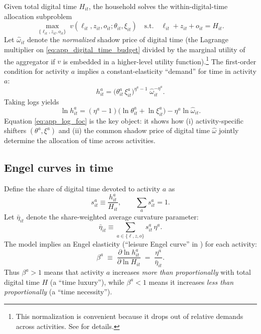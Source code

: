 \documentclass[12pt]{article}
\begin{document}
Given total digital time $H_{it}$, the household solves the within-digital-time allocation subproblem
\begin{equation}
\label{eq:app_subproblem}
\max_{\{\ell_{it},z_{it},o_{it}\}} \; v(\ell_{it},z_{it},o_{it};\theta_{it},\xi_{it})
\quad \text{s.t.}\quad
\ell_{it}+z_{it}+o_{it}=H_{it}.
\end{equation}
Let $\hat{\omega}_{it}$ denote the \emph{normalized} shadow price of digital time (the Lagrange multiplier on \eqref{eq:app_digital_time_budget} divided by the marginal utility of the aggregator if $v$ is embedded in a higher-level utility function).\footnote{This normalization is convenient because it drops out of relative demands across activities. See \citet{aguiar2021} for details.} The first-order condition for activity $a$ implies a constant-elasticity ``demand'' for time in activity $a$:
\begin{equation}
\label{eq:app_activity_demand}
h_{it}^{a}
=
\big(\theta_{it}^{a}\,\xi_{it}^{a}\big)^{\eta^{a}-1}\;
\hat{\omega}_{it}^{-\eta^{a}}.
\end{equation}
Taking logs yields
\begin{equation}
\label{eq:app_log_foc}
\ln h_{it}^{a}
=
(\eta^{a}-1)\big(\ln\theta_{it}^{a}+\ln\xi_{it}^{a}\big)
-\eta^{a}\ln\hat{\omega}_{it}.
\end{equation}
Equation \eqref{eq:app_log_foc} is the key object: it shows how (i) activity-specific shifters $(\theta^{a},\xi^{a})$ and (ii) the common shadow price of digital time $\hat{\omega}$ jointly determine the allocation of time across activities.

\subsection{Engel curves in time}
\label{app:engel_curves}

Define the share of digital time devoted to activity $a$ as
\begin{equation}
s_{it}^{a} \equiv \frac{h_{it}^{a}}{H_{it}},\qquad \sum_{a}s_{it}^{a}=1.
\end{equation}
Let $\bar{\eta}_{it}$ denote the share-weighted average curvature parameter:
\begin{equation}
\label{eq:app_eta_bar_def}
\bar{\eta}_{it} \equiv \sum_{a\in\{\ell,z,o\}} s_{it}^{a}\,\eta^{a}.
\end{equation}
The model implies an Engel elasticity (``leisure Engel curve'' in \citet{aguiar2021}) for each activity:
\begin{equation}
\label{eq:app_engel_elasticity}
\beta^{a}
\;\equiv\;
\frac{\partial \ln h_{it}^{a}}{\partial \ln H_{it}}
\;=\;
\frac{\eta^{a}}{\bar{\eta}_{it}}.
\end{equation}
Thus $\beta^{a}>1$ means that activity $a$ increases \emph{more than proportionally} with total digital time $H$ (a ``time luxury''), while $\beta^{a}<1$ means it increases \emph{less than proportionally} (a ``time necessity'').
\end{document}
